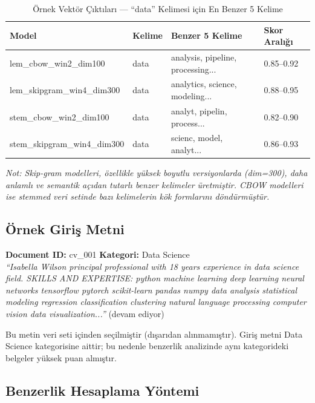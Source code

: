 \documentclass[12pt, a4paper]{article}
\begin{document}
\begin{table}[H]
\centering
\caption{Örnek Vektör Çıktıları — ``data'' Kelimesi için En Benzer 5 Kelime}
\begin{tabular}{llll}
\toprule
\textbf{Model} & \textbf{Kelime} & \textbf{Benzer 5 Kelime} & \textbf{Skor Aralığı} \\
\midrule
lem\_cbow\_win2\_dim100     & data & analysis, pipeline, processing... & 0.85--0.92 \\
lem\_skipgram\_win4\_dim300 & data & analytics, science, modeling...   & 0.88--0.95 \\
stem\_cbow\_win2\_dim100    & data & analyt, pipelin, process...       & 0.82--0.90 \\
stem\_skipgram\_win4\_dim300 & data & scienc, model, analyt...          & 0.86--0.93 \\
\bottomrule
\end{tabular}
\end{table}

\textit{Not: Skip-gram modelleri, özellikle yüksek boyutlu versiyonlarda (dim=300), daha anlamlı ve semantik açıdan tutarlı benzer kelimeler üretmiştir. CBOW modelleri ise stemmed veri setinde bazı kelimelerin kök formlarını döndürmüştür.}

\subsection{Örnek Giriş Metni}

\begin{mdframed}[style=bilgi]
\textbf{Document ID:} cv\_001 \quad \textbf{Kategori:} Data Science\\[0.3cm]
\textit{``Isabella Wilson principal professional with 18 years experience in data science field.
SKILLS AND EXPERTISE: python machine learning deep learning neural networks tensorflow pytorch
scikit-learn pandas numpy data analysis statistical modeling regression classification clustering
natural language processing computer vision data visualization...''} (devam ediyor)
\end{mdframed}

Bu metin veri seti içinden seçilmiştir (dışarıdan alınmamıştır). Giriş metni Data Science kategorisine aittir; bu nedenle benzerlik analizinde aynı kategorideki belgeler yüksek puan almıştır.

\subsection{Benzerlik Hesaplama Yöntemi}
\end{document}
